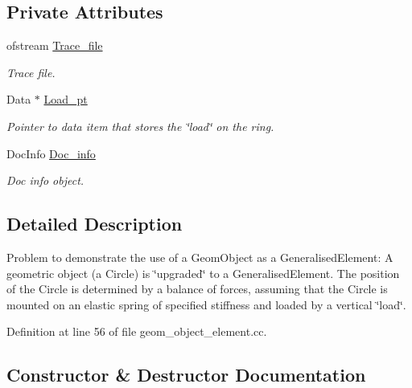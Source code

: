 \subsection*{Private Attributes}
\begin{DoxyCompactItemize}
\item 
ofstream \hyperlink{classGeomObjectAsGeneralisedElementProblem_ad6261e556a52596ba8904ee902ea6d70}{Trace\+\_\+file}
\begin{DoxyCompactList}\small\item\em Trace file. \end{DoxyCompactList}\item 
Data $\ast$ \hyperlink{classGeomObjectAsGeneralisedElementProblem_ac04469b2dbce010fff3f5b2cf5591bcd}{Load\+\_\+pt}
\begin{DoxyCompactList}\small\item\em Pointer to data item that stores the \char`\"{}load\char`\"{} on the ring. \end{DoxyCompactList}\item 
Doc\+Info \hyperlink{classGeomObjectAsGeneralisedElementProblem_a89a7f5fa555839193166f802d6ff6be2}{Doc\+\_\+info}
\begin{DoxyCompactList}\small\item\em Doc info object. \end{DoxyCompactList}\end{DoxyCompactItemize}


\subsection{Detailed Description}
Problem to demonstrate the use of a Geom\+Object as a Generalised\+Element\+: A geometric object (a Circle) is \char`\"{}upgraded\char`\"{} to a Generalised\+Element. The position of the Circle is determined by a balance of forces, assuming that the Circle is mounted on an elastic spring of specified stiffness and loaded by a vertical \char`\"{}load\char`\"{}. 

Definition at line 56 of file geom\+\_\+object\+\_\+element.\+cc.



\subsection{Constructor \& Destructor Documentation}
\mbox{\label{classGeomObjectAsGeneralisedElementProblem_ad1f15fcb6c055c58d1f71b522f1f7bd6}} 

